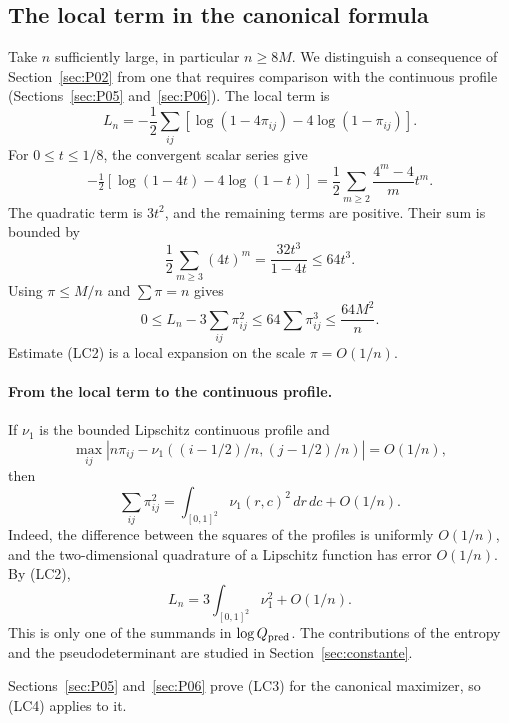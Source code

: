 \subsection{The local term in the canonical formula}\label{sec:P04}
Take $n$ sufficiently large, in particular $n\ge8M$.
We distinguish a consequence of Section~\ref{sec:P02} from one that requires
comparison with the continuous profile (Sections~\ref{sec:P05} and~\ref{sec:P06}).
The local term is
\[
 L_n=-\frac12\sum_{ij}
       [\log(1-4\pi_{ij})-4\log(1-\pi_{ij})].       \tag{LC1}
\]
For $0\le t\le1/8$, the convergent scalar series give
\[
 -\tfrac12[\log(1-4t)-4\log(1-t)]
   =\frac12\sum_{m\ge2}\frac{4^m-4}{m}t^m.
\]
The quadratic term is $3t^2$, and the remaining terms are positive.
Their sum is bounded by
\[
 \frac12\sum_{m\ge3}(4t)^m
       =\frac{32t^3}{1-4t}\le64t^3.
\]
Using $\pi\le M/n$ and $\sum\pi=n$ gives
\[
 0\le L_n-3\sum_{ij}\pi_{ij}^2
       \le64\sum\pi_{ij}^3\le\frac{64M^2}{n}.      \tag{LC2}
\]
Estimate (LC2) is a local expansion on the scale $\pi=O(1/n)$.

\paragraph{From the local term to the continuous profile.}
If $\nu_1$ is the bounded Lipschitz continuous profile and
\[
 \max_{ij}|n\pi_{ij}-\nu_1((i-1/2)/n,(j-1/2)/n)|=O(1/n),
                                                        \tag{LC3}
\]
then
\[
 \sum_{ij}\pi_{ij}^2
       =\int_{[0,1]^2}\nu_1(r,c)^2\,dr\,dc+O(1/n).
\]
Indeed, the difference between the squares of the profiles
is uniformly $O(1/n)$, and the two-dimensional quadrature
of a Lipschitz function has error $O(1/n)$.
By (LC2),
\[
 L_n=3\int_{[0,1]^2}\nu_1^2+O(1/n).               \tag{LC4}
\]
This is only one of the summands in $\log Q_{\rm pred}$. The contributions of the entropy and
the pseudodeterminant are studied in Section~\ref{sec:constante}.

Sections~\ref{sec:P05} and~\ref{sec:P06} prove (LC3) for the canonical maximizer,
so (LC4) applies to it.
